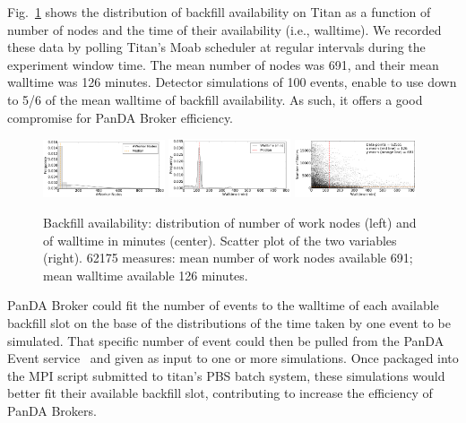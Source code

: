 Fig.~\ref{fig:backfill-distrib} shows the distribution of backfill
availability on Titan as a function of number of nodes and the time of their
availability (i.e., walltime). We recorded these data by polling Titan's Moab
scheduler at regular intervals during the experiment window time. The mean
number of nodes was 691, and their mean walltime was 126 minutes. Detector
simulations of 100 events, enable to use down to 5/6 of the mean walltime of
backfill availability. As such, it offers a good compromise for PanDA Broker
efficiency.

\begin{figure}[!t]
    \includegraphics[clip,width=0.32\textwidth]{figures/titan_backfill_wnodes_distribution.pdf}
    \includegraphics[clip,width=0.32\textwidth]{figures/titan_backfill_walltime_distribution.pdf}
    \includegraphics[clip,width=0.32\textwidth]{figures/titan_backfill_avail.png}
   \vspace{-0.1in}
    \caption{Backfill availability: distribution of number of work nodes
    (left) and of walltime in minutes (center). Scatter plot of the two
    variables (right). 62175 measures: mean number of work nodes available
    691; mean walltime available 126 minutes.}

\label{fig:backfill-distrib}
\end{figure}

PanDA Broker could fit the number of events to the walltime of each available
backfill slot on the base of the distributions of the time taken by one event
to be simulated. That specific number of event could then be pulled from the
PanDA Event service~\cite{calafiura2015atlas} and given as input to one or
more simulations. Once packaged into the MPI script submitted to titan's PBS
batch system, these simulations would better fit their available backfill
slot, contributing to increase the efficiency of PanDA Brokers.

